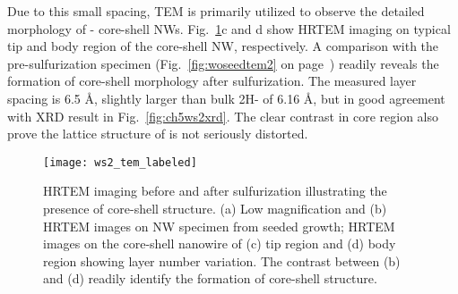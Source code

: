 Due to this small spacing, TEM is primarily utilized to observe the detailed morphology of - core-shell NWs. Fig.~\ref{fig:ch5ws2tem1}c and d show HRTEM imaging on typical tip and body region of the core-shell NW, respectively. A comparison with the pre-sulfurization specimen (Fig.~\ref{fig:woseedtem2} on page~\pageref{fig:woseedtem2}) readily reveals the formation of core-shell morphology after sulfurization. The measured layer spacing is 6.5 \si{\angstrom}, slightly larger than bulk 2H- of 6.16 \si{\angstrom}, but in good agreement with XRD result in Fig.~\ref{fig:ch5ws2xrd}. The clear contrast in core region also prove the lattice structure of  is not seriously distorted.
\begin{figure}[htb]
\centering
\texttt{[image: ws2\_tem\_labeled]}
\caption[HRTEM imaging before and after sulfurization]{HRTEM imaging before and after sulfurization illustrating the presence of core-shell structure. (a) Low magnification and (b) HRTEM images on  NW specimen from seeded growth;  HRTEM images on the core-shell nanowire of (c) tip region and (d) body region showing layer number variation. The contrast between (b) and (d) readily identify the formation of core-shell structure. }
\label{fig:ch5ws2tem1}
\end{figure}

